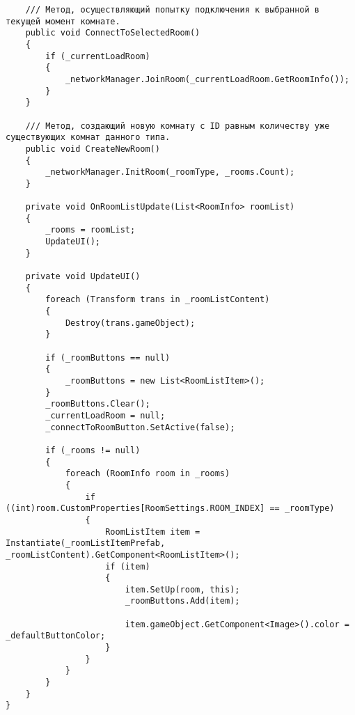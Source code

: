 \begin{verbatim}
    /// Метод, осуществляющий попытку подключения к выбранной в текущей момент комнате.
    public void ConnectToSelectedRoom()
    {
        if (_currentLoadRoom)
        {
            _networkManager.JoinRoom(_currentLoadRoom.GetRoomInfo());
        }
    }

    /// Метод, создающий новую комнату с ID равным количеству уже существующих комнат данного типа.
    public void CreateNewRoom()
    {
        _networkManager.InitRoom(_roomType, _rooms.Count);
    }

    private void OnRoomListUpdate(List<RoomInfo> roomList)
    {
        _rooms = roomList;
        UpdateUI();
    }

    private void UpdateUI()
    {
        foreach (Transform trans in _roomListContent)
        {
            Destroy(trans.gameObject);
        }

        if (_roomButtons == null)
        {
            _roomButtons = new List<RoomListItem>();
        }
        _roomButtons.Clear();
        _currentLoadRoom = null;
        _connectToRoomButton.SetActive(false);

        if (_rooms != null)
        {
            foreach (RoomInfo room in _rooms)
            {
                if ((int)room.CustomProperties[RoomSettings.ROOM_INDEX] == _roomType)
                {
                    RoomListItem item = Instantiate(_roomListItemPrefab, _roomListContent).GetComponent<RoomListItem>();
                    if (item)
                    {
                        item.SetUp(room, this);
                        _roomButtons.Add(item);

                        item.gameObject.GetComponent<Image>().color = _defaultButtonColor;
                    }
                }
            }
        }
    }
}

\end{verbatim}
